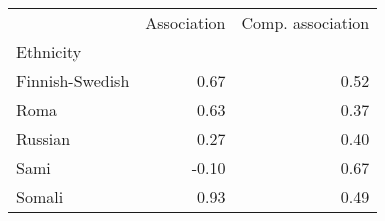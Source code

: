 \begin{tabular}{lrr}
\toprule
{} &  Association &  Comp. association \\
Ethnicity       &              &                    \\
\midrule
Finnish-Swedish &         0.67 &               0.52 \\
Roma            &         0.63 &               0.37 \\
Russian         &         0.27 &               0.40 \\
Sami            &        -0.10 &               0.67 \\
Somali          &         0.93 &               0.49 \\
\bottomrule
\end{tabular}
